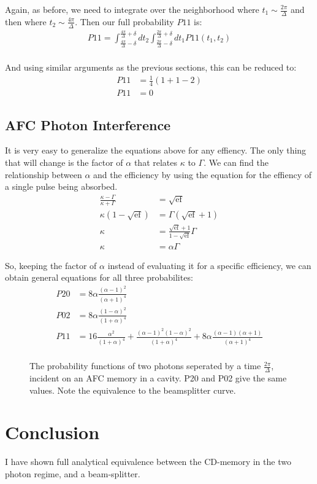 \documentclass[12pt]{article}
\begin{document}
Again, as before, we need to integrate over the neighborhood where $t_1 \sim \frac{2 \pi}{\Delta}$ and then where $t_2 \sim \frac{4 \pi}{\Delta}$. Then our full probability $P11$ is:
\begin{align}
P11 = \int^{\frac{4 \pi}{\Delta}+\delta}_{\frac{4 \pi}{\Delta}-\delta}dt_2 \int^{\frac{2 \pi}{\Delta}+\delta}_{\frac{2 \pi}{\Delta}-\delta}dt_1 P11(t_1, t_2)\\
\end{align}

And using similar arguments as the previous sections, this can be reduced to:
\begin{align}
P11 &= \frac{1}{4}\left ( 1 + 1 -2\right) \\
P11 &= 0
\end{align}
\subsection{AFC Photon Interference}
It is very easy to generalize the equations above for any effiency. The only thing that will change
is the factor of $\alpha$ that relates $\kappa$ to $\Gamma$. We can find the relationship between
$\alpha$ and the efficiency by using the equation for the effiency of a single pulse being absorbed.
\begin{align}
\frac{\kappa - \Gamma}{\kappa+\Gamma}& = \sqrt{\textrm{ef}} \\
\kappa \left(1-\sqrt{\textrm{ef}}\right) &= \Gamma \left(\sqrt{\textrm{ef}}+1\right)\\
\kappa &= \frac{\sqrt{\textrm{ef}} + 1}{1-\sqrt{\textrm{ef}}}\Gamma\\
\kappa &= \alpha \Gamma
\end{align}

So, keeping the factor of $\alpha$ instead of evaluating it for a specific efficiency, we can
obtain general equations for all three probabilites:
\begin{align}
P20 & =8\alpha \frac{(\alpha -1)^2}{(\alpha+1)^4} \\
P02 &= 8\alpha \frac{(1-\alpha)^2}{(1+\alpha)^4}\\
P11 & = 16\frac{\alpha^2}{(1+\alpha)^4} +\frac{(\alpha-1)^2(1-\alpha)^2}{(1+\alpha)^4}+8\alpha \frac{(\alpha-1)(\alpha+1)}{(\alpha+1)^4}\\
\end{align}
\label{general}

\begin{figure}[H]
\caption{The probability functions of two photons seperated by a time $\frac{2 \pi}{\Delta}$, incident on an AFC memory in a cavity. P20 and P02 give the same values. Note the
equivalence to the beamsplitter curve.}

\end{figure}


\section{Conclusion}

I have shown full analytical equivalence between the CD-memory in the two photon regime, and a beam-splitter.
\end{document}
